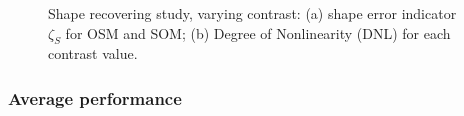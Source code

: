\documentclass{IEEEtran}
\begin{document}
                \begin{figure}[!htb]
                    \centering
                     \hspace{0.01\columnwidth}
                    \caption{Shape recovering study, varying contrast: (a) shape error indicator $\zeta_S$ for OSM and SOM; (b) Degree of Nonlinearity (DNL) for each contrast value.}
                    \label{fig:shape:vary:indicators}
                \end{figure}

			\subsubsection{Average performance}\label{sec:results:shape:average}

\end{document}
